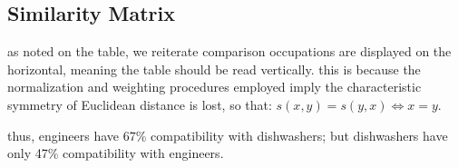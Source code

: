 \documentclass{article}
\begin{document}
\MatchesDishwashers

\subsection{Similarity Matrix}

\SimilarityMatrix

as noted on the table, we reiterate comparison occupations are displayed on the horizontal, meaning the table should be read vertically. this is because the normalization and weighting procedures employed imply the characteristic symmetry of Euclidean distance is lost, so that: $s(x,y) = s(y,x) \iff x = y$.

thus, engineers have 67\% compatibility with dishwashers; but dishwashers have only 47\% compatibility with engineers.

\end{document}
